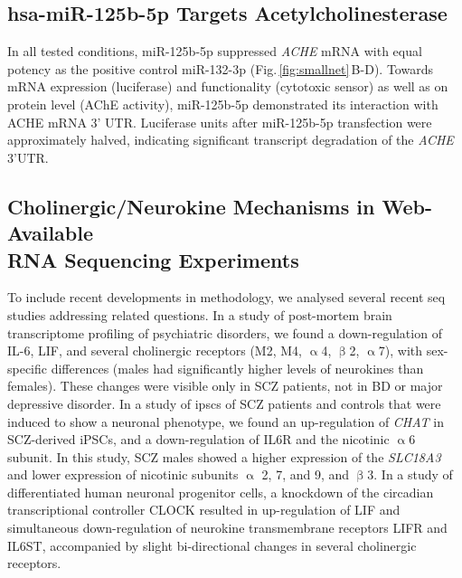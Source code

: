 \subsection{hsa-miR-125b-5p Targets Acetylcholinesterase}
In all tested conditions, miR-125b-5p suppressed \emph{ACHE} mRNA with equal potency as the positive control miR-132-3p (Fig.\,\ref{fig:smallnet}\,B-D). Towards mRNA expression (luciferase) and functionality (cytotoxic sensor) as well as on protein level (AChE activity), miR-125b-5p demonstrated its interaction with ACHE mRNA 3' UTR. Luciferase units after miR-125b-5p transfection were approximately halved, indicating significant transcript degradation of the \emph{ACHE} 3'UTR.

\subsection{Cholinergic/Neurokine Mechanisms in Web-Available\\ RNA Sequencing Experiments}
To include recent developments in methodology, we analysed several recent \ac{seq} studies addressing related questions. In a study of post-mortem brain transcriptome profiling of psychiatric disorders,\cite{Ramaker2017} we found a down-regulation of IL-6, LIF, and several cholinergic receptors (M2, M4, $\upalpha$4, $\upbeta$2, $\upalpha$7), with sex-specific differences (males had significantly higher levels of neurokines than females). These changes were visible only in SCZ patients, not in BD or major depressive disorder. In a study of \acp{ipsc} of SCZ patients and controls that were induced to show a neuronal phenotype,\cite{Hoffman2017} we found an up-regulation of \emph{CHAT} in SCZ-derived iPSCs, and a down-regulation of IL6R and the nicotinic $\upalpha$6 subunit. In this study, SCZ males showed a higher expression of the \emph{SLC18A3} and lower expression of nicotinic subunits $\upalpha$ 2, 7, and 9, and $\upbeta$3. In a study of differentiated human neuronal progenitor cells,\cite{Fontenot2017} a knockdown of the circadian transcriptional controller CLOCK resulted in up-regulation of LIF and simultaneous down-regulation of neurokine transmembrane receptors LIFR and IL6ST, accompanied by slight bi-directional changes in several cholinergic receptors.
